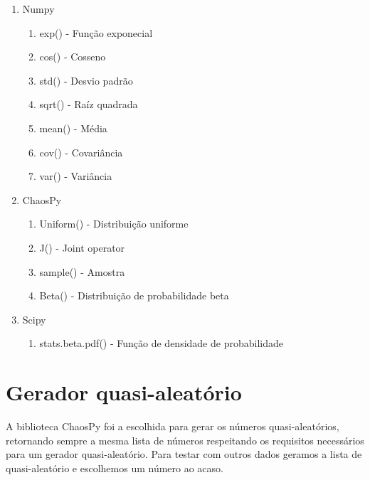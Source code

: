 \documentclass{article}
\begin{document}
\begin{enumerate}

    \item Numpy
    
        \begin{enumerate}
        
            \item exp() - Função exponecial 
            \item cos() - Cosseno
            \item std() - Desvio padrão
            \item sqrt() - Raíz quadrada
            \item mean() - Média
            \item cov() - Covariância
            \item var() - Variância
            
        \end{enumerate}
        
    \item ChaosPy
    
        \begin{enumerate}
        
            \item Uniform() - Distribuição uniforme
            \item J() - Joint operator
            \item sample() - Amostra
            \item Beta() -  Distribuição de probabilidade beta
            
        \end{enumerate}
        
    \item Scipy
    
        \begin{enumerate}
        
            \item stats.beta.pdf() - Função de densidade de probabilidade
            
        \end{enumerate}
        
\end{enumerate}

\section{Gerador quasi-aleatório}
A biblioteca ChaosPy foi a escolhida para gerar os números quasi-aleatórios, retornando sempre a mesma lista de números respeitando os requisitos necessários para um gerador quasi-aleatório. Para testar com outros dados geramos a lista de quasi-aleatório e escolhemos um número ao acaso.
\end{document}
